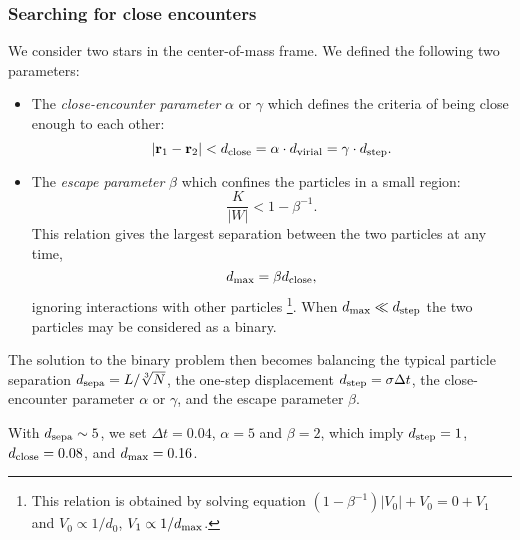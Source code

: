 \subsubsection*{Searching for close encounters}
We consider two stars in the center-of-mass frame. We defined the following two 
parameters:
\begin{itemize}
	\item The \textit{close-encounter parameter} $ \alpha $ or $ \gamma $ which defines the 
	criteria of being close enough to each other:
	\begin{equation}\label{eq:r12}
	| \mathbf{r}_1 - \mathbf{r}_2 | < d_{\rm close} = \alpha \cdot d_{\rm virial} = \gamma \cdot d_{\rm step}.
	\end{equation}
	\item The \textit{escape parameter} $ \beta $ which confines the particles in a small 
	region:
	\begin{equation}\label{key}
	\frac{K}{|W|} < 1 - \beta^{-1}.
	\end{equation}
	This relation gives the largest separation between the two particles at any time, 
	\begin{equation}
	d_{\rm max} = \beta d_{\rm close},
	\end{equation}
	ignoring interactions with other particles
	\footnote{This relation is obtained by solving  equation $ (1 - \beta^{-1}) |V_0| + V_0 = 0 
	+ V_1 $ and $ V_0 \propto 1/d_0 $,	$ V_1 \propto 1/d_{\rm max} $.}.
	When $ d_{\rm max} \ll d_{\rm step} $ the two particles may be considered as a 
	binary.
\end{itemize}

The solution to the binary problem then becomes balancing the typical particle 
separation $ d_{\rm sepa} = L/\sqrt[3]{N} $, the one-step displacement $ d_{\rm 
step} = \sigma \Delta t $, the close-encounter parameter $ \alpha $ or $ \gamma $, and 
the escape parameter $ \beta $.

With $ d_{\rm sepa} \sim 5 $, we set $ \Delta t = 0.04 $, $ \alpha = 5 $ and $ \beta = 2 $, 
which imply $ d_{\rm step} = 1 $, $ d_{\rm close} = 0.08 $, and $ d_{\rm max} = 0.16 $.


